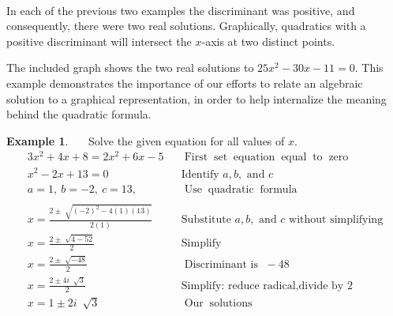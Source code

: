 \documentclass[12pt]{book}
\theoremstyle{definition}
\newtheorem{example}{Example}
\newcommand{\tmop}[1]{\ensuremath{\operatorname{#1}}}
\begin{document}
\begin{multicols}{2}
\begin{center}
\end{center}

\columnbreak

\ \par
In each of the previous two examples the discriminant was positive, and consequently, there were two real solutions. Graphically, quadratics with a positive discriminant will intersect the $x$-axis at two distinct points.\par
The included graph shows the two real solutions to $25 x^2 - 30 x - 11 = 0 $.  This example demonstrates the importance of our efforts to relate an algebraic solution to a graphical representation, in order to help internalize the meaning behind the quadratic formula.
\end{multicols}
\begin{example}~~~Solve the given equation for all values of $x$.
\begin{eqnarray*}
    3 x^2 + 4 x + 8 = 2 x^2 + 6 x - 5 &  & \tmop{First} \tmop{set}
    \tmop{equation} \tmop{equal} \tmop{to} \tmop{zero}\\
    x^2 - 2 x + 13 = 0 &  &  \text{Identify~} a,b, \text{~and~}c\\ 
		a = 1,~ b = - 2,~ c = 13, & & \tmop{Use} \tmop{quadratic} \tmop{formula}\\
		& & \\
    x = \frac{2 \pm \sqrt[]{(- 2)^2 - 4 (1) (13)}}{2 (1)} &  & \text{Substitute~} a,b, \text{~and~} c \text{~without~simplifying}\\
   x = \frac{2 \pm \sqrt[]{4 - 52}}{2} &  & \text{Simplify}\\
    x = \frac{2 \pm \sqrt[]{- 48}}{2} &  & \tmop{Discriminant~is~}-48\\
    x = \frac{2 \pm 4 i~ \sqrt[]{3}}{2} &  & \tmop{Simplify:~reduce~radical,} \text{divide~by~2}\\
    x = 1 \pm 2 i~ \sqrt[]{3} &  & \tmop{Our} \tmop{solutions}
  \end{eqnarray*}
\end{example}
\end{document}
